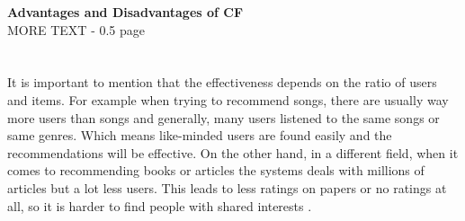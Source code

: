 \documentclass[10pt,oneside,english,a4paper]{article}
\begin{document}
%
%
%
%
\textbf{Advantages and Disadvantages of CF}\\
MORE TEXT - 0.5 page\\\\\\
%
%
It is important to mention that the effectiveness depends on the ratio of users and items. For example when trying to recommend songs, there are usually way more users than songs and generally, many users listened to the same songs or same genres. Which means like-minded users are found easily and the recommendations will be effective. On the other hand, in a different field, when it comes to recommending books or articles the systems deals with millions of articles but a lot less users. This leads to less ratings on papers or no ratings at all, so it is harder to find people with shared interests \cite{Beel2016305}.\\
\end{document}
